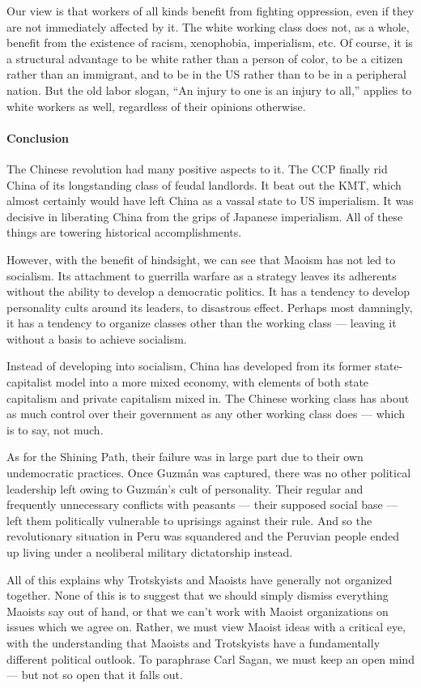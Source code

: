 Our view is that workers of all kinds benefit from fighting oppression, even if they are not immediately affected by it. The white working class does not, as a whole, benefit from the existence of racism, xenophobia, imperialism, etc. Of course, it is a structural advantage to be white rather than a person of color, to be a citizen rather than an immigrant, and to be in the US rather than to be in a peripheral nation. But the old labor slogan, ``An injury to one is an injury to all,'' applies to white workers as well, regardless of their opinions otherwise.

\paragraph{Conclusion}

The Chinese revolution had many positive aspects to it. The CCP finally rid China of its longstanding class of feudal landlords. It beat out the KMT, which almost certainly would have left China as a vassal state to US imperialism. It was decisive in liberating China from the grips of Japanese imperialism. All of these things are towering historical accomplishments.

However, with the benefit of hindsight, we can see that Maoism has not led to socialism. Its attachment to guerrilla warfare as a strategy leaves its adherents without the ability to develop a democratic politics. It has a tendency to develop personality cults around its leaders, to disastrous effect. Perhaps most damningly, it has a tendency to organize classes other than the working class --- leaving it without a basis to achieve socialism.

Instead of developing into socialism, China has developed from its former state-capitalist model into a more mixed economy, with elements of both state capitalism and private capitalism mixed in. The Chinese working class has about as much control over their government as any other working class does --- which is to say, not much.

As for the Shining Path, their failure was in large part due to their own undemocratic practices. Once Guzm\'{a}n was captured, there was no other political leadership left owing to Guzm\'{a}n's cult of personality. Their regular and frequently unnecessary conflicts with peasants --- their supposed social base --- left them politically vulnerable to uprisings against their rule. And so the revolutionary situation in Peru was squandered and the Peruvian people ended up living under a neoliberal military dictatorship instead.

All of this explains why Trotskyists and Maoists have generally not organized together. None of this is to suggest that we should simply dismiss everything Maoists say out of hand, or that we can't work with Maoist organizations on issues which we agree on. Rather, we must view Maoist ideas with a critical eye, with the understanding that Maoists and Trotskyists have a fundamentally different political outlook. To paraphrase Carl Sagan, we must keep an open mind --- but not so open that it falls out.
